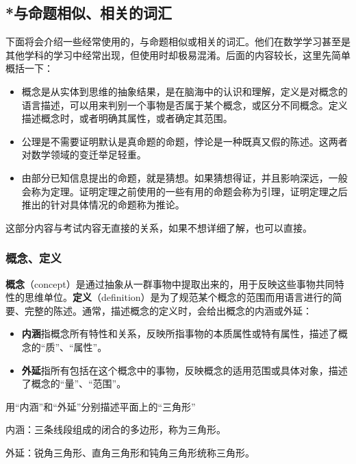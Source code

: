 \subsection{*与命题相似、相关的词汇}

下面将会介绍一些经常使用的，与命题相似或相关的词汇。他们在数学学习甚至是其他学科的学习中经常出现，但使用时却极易混淆。后面的内容较长，这里先简单概括一下：

\begin{itemize}
\item 概念是从实体到思维的抽象结果，是在脑海中的认识和理解，定义是对概念的语言描述，可以用来判别一个事物是否属于某个概念，或区分不同概念。定义描述概念时，或者明确其属性，或者确定其范围。
\item 公理是不需要证明默认是真命题的命题，悖论是一种既真又假的陈述。这两者对数学领域的变迁举足轻重。
\item 由部分已知信息提出的命题，就是猜想。如果猜想得证，并且影响深远，一般会称为定理。证明定理之前使用的一些有用的命题会称为引理，证明定理之后推出的针对具体情况的命题称为推论。
\end{itemize}

这部分内容与考试内容无直接的关系，如果不想详细了解，也可以直接。

\subsubsection{概念、定义}

\textbf{概念}（concept）是通过抽象从一群事物中提取出来的，用于反映这些事物共同特性的思维单位。\textbf{定义}（definition）是为了规范某个概念的范围而用语言进行的简要、完整的陈述。通常，描述概念的定义时，会给出概念的内涵或外延：
\begin{itemize}
\item \textbf{内涵}指概念所有特性和关系，反映所指事物的本质属性或特有属性，描述了概念的“质”、“属性”。
\item \textbf{外延}指所有包括在这个概念中的事物，反映概念的适用范围或具体对象，描述了概念的“量”、“范围”。
\end{itemize}

\begin{example}{用“内涵”和“外延”分别描述平面上的“三角形”}

内涵：三条线段组成的闭合的多边形，称为三角形。

外延：锐角三角形、直角三角形和钝角三角形统称三角形。

\end{example}

